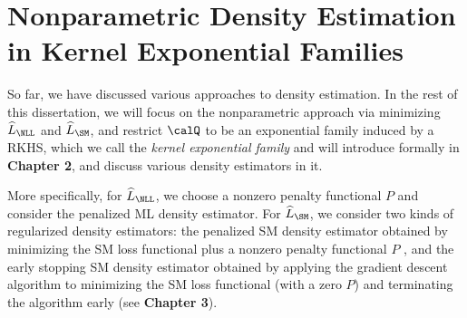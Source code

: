 \documentclass[12pt]{article}
\theoremstyle{definition}
\theoremstyle{theorem}
\theoremstyle{remark}
\begin{document}

\section{Nonparametric Density Estimation in Kernel Exponential Families}\label{section-our-focus}

So far, we have discussed various approaches to density estimation. In the rest of this dissertation, we will focus on the nonparametric approach via minimizing $\widehat{L}_{\NLL}$ and $\widehat{L}_{\SM}$, and restrict $\calQ$ to be an exponential family induced by a RKHS, which we call the \textit{kernel exponential family} and will introduce formally in \textbf{\color{red} Chapter 2}, and discuss various density estimators in it. 

More specifically, for $\widehat{L}_{\NLL}$, we choose a nonzero penalty functional $P$ and consider the penalized ML density estimator. For $\widehat{L}_{\SM}$, we consider two kinds of regularized density estimators: the penalized SM density estimator obtained by minimizing the SM loss functional plus a nonzero penalty functional $P$ \parencites{Sriperumbudur-density-estimation-inf-exp-family}, and the early stopping SM density estimator obtained by applying the gradient descent algorithm to minimizing the SM loss functional (with a zero $P$) and terminating the algorithm early (see \textbf{\color{red} Chapter 3}). 
\end{document}
